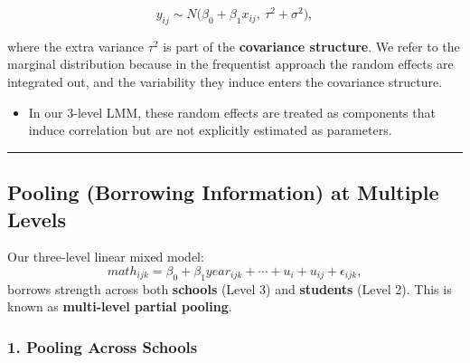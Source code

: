 \documentclass[
  letterpaper,
  DIV=11,
  numbers=noendperiod]{scrreprt}
\providecommand{\tightlist}{%
  \setlength{\itemsep}{0pt}\setlength{\parskip}{0pt}}\usepackage{longtable,booktabs,array}
\begin{document}
\[
y_{ij} \sim N\!\big(\beta_0 + \beta_1 x_{ij}, \ \tau^2 + \sigma^2\big),
\]

where the extra variance \(\tau^2\) is part of the \textbf{covariance
structure}. We refer to the marginal distribution because in the
frequentist approach the random effects are integrated out, and the
variability they induce enters the covariance structure.

\begin{itemize}
\tightlist
\item
  In our 3-level LMM, these random effects are treated as components
  that induce correlation but are not explicitly estimated as
  parameters.
\end{itemize}

\begin{center}\rule{0.5\linewidth}{0.5pt}\end{center}

\hypertarget{pooling-borrowing-information-at-multiple-levels}{%
\subsection*{Pooling (Borrowing Information) at Multiple
Levels}\label{pooling-borrowing-information-at-multiple-levels}}

Our three-level linear mixed model: \[
math_{ijk} = \beta_0 + \beta_1 year_{ijk} + \cdots + u_i + u_{ij} + \epsilon_{ijk},
\] borrows strength across both \textbf{schools} (Level 3) and
\textbf{students} (Level 2). This is known as \textbf{multi-level
partial pooling}.

\hypertarget{pooling-across-schools}{%
\subsubsection*{1. Pooling Across
Schools}\label{pooling-across-schools}}
\end{document}
